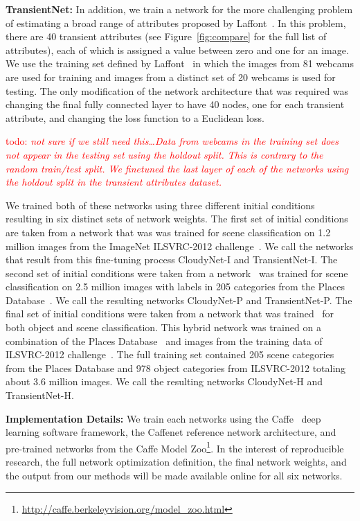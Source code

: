 \documentclass{article}
\newcommand{\todo}[1]{\textcolor{red}{todo: {\em #1}}}
\newcommand{\figref}[1]{Figure~\ref{fig:#1}}
\begin{document}
\textbf{TransientNet:} In addition, we train a network for the more
challenging problem of estimating a broad range of attributes proposed
by Laffont~\cite{Laffont14}.  In this problem, there are 40 transient
attributes (see \figref{compare} for the full list of
attributes), each of which is assigned a value between zero and one
for an image. We use the training set defined by
Laffont~\cite{Laffont14} in which the images from 81 webcams are used
for training and images from a distinct set of 20 webcams is used for
testing.  The only modification of the network architecture that was
required was changing the final fully connected layer to have 40
nodes, one for each transient attribute, and changing the loss
function to a Euclidean loss. 

\todo{not sure if we still need this\dots Data from webcams in the
training set does not appear in the testing set using the holdout
split.  This is contrary to the random train/test split.  We finetuned
the last layer of each of the networks using the holdout split in the
transient attributes dataset.}

We trained both of these networks using three different initial
conditions resulting in six distinct sets of network weights. The
first set of initial conditions are taken from a network that was was
trained for scene classification on 1.2 million images from the
ImageNet ILSVRC-2012 challenge~\cite{ILSVRCarxiv14}.  We call the
networks that result from this fine-tuning process CloudyNet-I and
TransientNet-I.  The second set of initial conditions were taken from
a network~\cite{zhou2014places} was trained for scene classification
on 2.5 million images with labels in 205 categories from the Places
Database~\cite{zhou2014places}. We call the resulting networks
CloudyNet-P and TransientNet-P.  The final set of initial conditions
were taken from a network that was trained~\cite{zhou2014places} for
both object and scene classification.  This hybrid network was trained
on a combination of the Places Database~\cite{zhou2014places} and
images from the training data of ILSVRC-2012
challenge~\cite{ILSVRCarxiv14}.  The full training set contained 205
scene categories from the Places Database and 978 object categories
from ILSVRC-2012 totaling about 3.6 million images.  We call the
resulting networks CloudyNet-H and TransientNet-H.

\textbf{Implementation Details:} We train each networks using the
Caffe~\cite{caffe14} deep learning software framework, the Caffenet
reference network architecture, and pre-trained networks from the
Caffe Model
Zoo\footnote{\url{http://caffe.berkeleyvision.org/model_zoo.html}}.
In the interest of reproducible research, the full network
optimization definition, the final network weights, and the output
from our methods will be made available online for all six networks.
\end{document}
